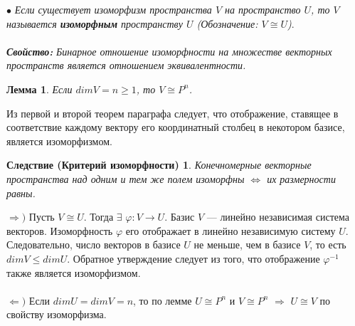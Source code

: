 $\bullet$ \textit{Если существует изоморфизм пространства $V$ на пространство $U$, то $V$ называется \textbf{изоморфным} пространству $U$ (Обозначение: $V \cong U$)}.\\\\
\textbf{\textit{Свойство: }}\textit{Бинарное отношение изоморфности на множестве векторных пространств является отношением эквивалентности.}
\newtheorem*{th4_3}{Лемма}\begin{th4_3} Если $dim V = n \geqslant 1$, то $V \cong P^n$.
\end{th4_3}
\begin{Proof}
	Из первой и второй теорем параграфа следует, что отображение, ставящее в соответствие каждому вектору его координатный столбец в некотором базисе, является изоморфизмом.
\end{Proof}
\newtheorem*{th4_4}{Следствие (Критерий изоморфности)}\begin{th4_4} Конечномерные векторные пространства над одним и тем же полем изоморфны $\Longleftrightarrow$ их размерности равны.
\end{th4_4}
\begin{Proof} $\Rightarrow)$ Пусть $V \cong U$. Тогда $\exists$ $\varphi: V \rightarrow U$. Базис $V$ --- линейно независимая система векторов. Изоморфность $\varphi$ его отображает в линейно независимую систему $U$. Следовательно, число векторов в базисе $U$ не меньше, чем в базисе $V$, то есть $dimV\leqslant dim U$. Обратное утверждение следует из того, что отображение $\varphi ^{-1}$ также является изоморфизмом.\\\\
	$\Leftarrow)$ Если $dimU = dimV=n$, то по лемме $U \cong P^n$ и $V \cong P^n$ $\Rightarrow$ $U \cong V$ по свойству изоморфизма.
\end{Proof} 












